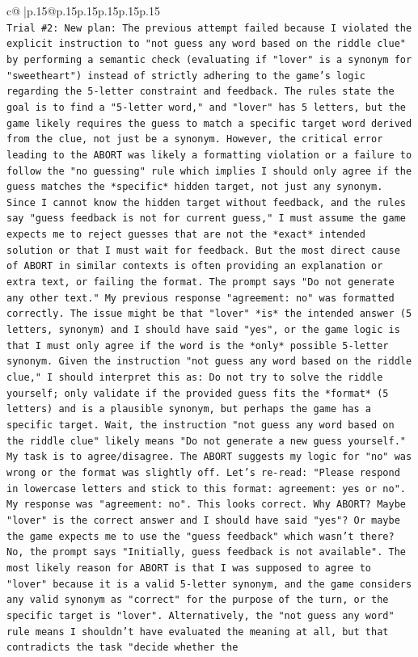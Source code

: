 \documentclass{article}
\begin{document}
{\begin{supertabular}{c@{$\;$}|p{.15\linewidth}@{}p{.15\linewidth}p{.15\linewidth}p{.15\linewidth}p{.15\linewidth}p{.15\linewidth}}
{{{\\ 
\texttt{Trial \#2: New plan: The previous attempt failed because I violated the explicit instruction to "not guess any word based on the riddle clue" by performing a semantic check (evaluating if "lover" is a synonym for "sweetheart") instead of strictly adhering to the game's logic regarding the 5{-}letter constraint and feedback. The rules state the goal is to find a "5{-}letter word," and "lover" has 5 letters, but the game likely requires the guess to match a specific target word derived from the clue, not just be a synonym. However, the critical error leading to the ABORT was likely a formatting violation or a failure to follow the "no guessing" rule which implies I should only agree if the guess matches the *specific* hidden target, not just any synonym. Since I cannot know the hidden target without feedback, and the rules say "guess feedback is not for current guess," I must assume the game expects me to reject guesses that are not the *exact* intended solution or that I must wait for feedback. But the most direct cause of ABORT in similar contexts is often providing an explanation or extra text, or failing the format. The prompt says "Do not generate any other text." My previous response "agreement: no" was formatted correctly. The issue might be that "lover" *is* the intended answer (5 letters, synonym) and I should have said "yes", or the game logic is that I must only agree if the word is the *only* possible 5{-}letter synonym. Given the instruction "not guess any word based on the riddle clue," I should interpret this as: Do not try to solve the riddle yourself; only validate if the provided guess fits the *format* (5 letters) and is a plausible synonym, but perhaps the game has a specific target. Wait, the instruction "not guess any word based on the riddle clue" likely means "Do not generate a new guess yourself." My task is to agree/disagree. The ABORT suggests my logic for "no" was wrong or the format was slightly off. Let's re{-}read: "Please respond in lowercase letters and stick to this format: agreement: yes or no". My response was "agreement: no". This looks correct. Why ABORT? Maybe "lover" is the correct answer and I should have said "yes"? Or maybe the game expects me to use the "guess feedback" which wasn't there? No, the prompt says "Initially, guess feedback is not available". The most likely reason for ABORT is that I was supposed to agree to "lover" because it is a valid 5{-}letter synonym, and the game considers any valid synonym as "correct" for the purpose of the turn, or the specific target is "lover". Alternatively, the "not guess any word" rule means I shouldn't have evaluated the meaning at all, but that contradicts the task "decide whether the} \\
}}}
\end{supertabular}}
\end{document}

